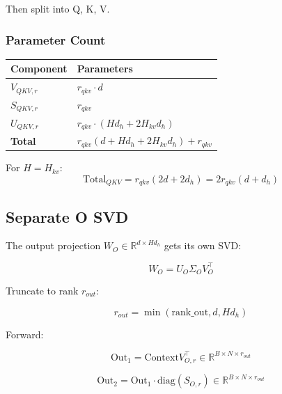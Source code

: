 Then split into Q, K, V.

\subsubsection{Parameter Count}

\begin{table}[H]
\centering
\small
\begin{tabular}{ll}
\toprule
\textbf{Component} & \textbf{Parameters} \\
\midrule
$V_{QKV, r}$ & $r_{qkv} \cdot d$ \\
$S_{QKV, r}$ & $r_{qkv}$ \\
$U_{QKV, r}$ & $r_{qkv} \cdot (H d_h + 2 H_{kv} d_h)$ \\
\textbf{Total} & $r_{qkv} (d + H d_h + 2 H_{kv} d_h) + r_{qkv}$ \\
\bottomrule
\end{tabular}
\end{table}

For $H = H_{kv}$:
\begin{equation}
\text{Total}_{QKV} = r_{qkv} (2d + 2 d_h) = 2 r_{qkv} (d + d_h)
\end{equation}

\subsection{Separate O SVD}

The output projection $W_O \in \mathbb{R}^{d \times H d_h}$ gets its own SVD:

\begin{equation}
W_O = U_O \Sigma_O V_O^\top
\end{equation}

Truncate to rank $r_{out}$:

\begin{equation}
r_{out} = \min(\text{rank\_out}, d, H d_h)
\end{equation}

Forward:

\begin{equation}
\text{Out}_1 = \text{Context} V_{O, r}^\top \in \mathbb{R}^{B \times N \times r_{out}}
\end{equation}

\begin{equation}
\text{Out}_2 = \text{Out}_1 \cdot \text{diag}(S_{O, r}) \in \mathbb{R}^{B \times N \times r_{out}}
\end{equation}

